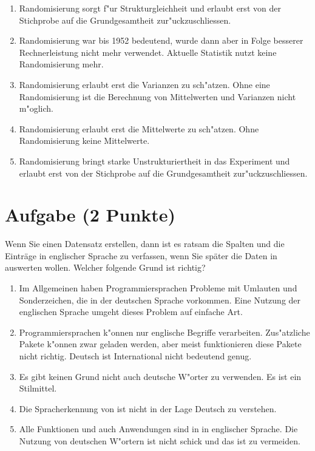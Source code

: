 \documentclass[a4paper, 10pt]{scrartcl}\usepackage[]{graphicx}\usepackage[]{xcolor}
\begin{document}
\begin{enumerate}
\item [\textbf{A} \msquare] Randomisierung sorgt f{"u}r Strukturgleichheit und erlaubt erst von der Stichprobe auf die Grundgesamtheit zur{"u}ckzuschliessen.
\item [\textbf{B} \msquare] Randomisierung war bis 1952 bedeutend, wurde dann aber in Folge besserer Rechnerleistung nicht mehr verwendet. Aktuelle Statistik nutzt keine Randomisierung mehr.
\item [\textbf{C} \msquare] Randomisierung erlaubt erst die Varianzen zu sch{"a}tzen. Ohne eine Randomisierung ist die Berechnung von Mittelwerten und Varianzen nicht m{"o}glich.
\item [\textbf{D} \msquare] Randomisierung erlaubt erst die Mittelwerte zu sch{"a}tzen. Ohne Randomisierung keine Mittelwerte.
\item [\textbf{E} \msquare] Randomisierung bringt starke Unstrukturiertheit in das Experiment und erlaubt erst von der Stichprobe auf die Grundgesamtheit zur{"u}ckzuschliessen.
\end{enumerate}

\section{Aufgabe \hfill (2 Punkte)}

Wenn Sie einen Datensatz erstellen, dann ist es ratsam die Spalten und die
Eintr{\"a}ge in englischer Sprache zu verfassen, wenn Sie sp{\"a}ter die Daten in
\Rlogo auswerten wollen. Welcher folgende Grund ist richtig?



\begin{enumerate}
\item [\textbf{A} \msquare] Im Allgemeinen haben Programmiersprachen Probleme mit Umlauten und Sonderzeichen, die in der deutschen Sprache vorkommen. Eine Nutzung der englischen Sprache umgeht dieses Problem auf einfache Art.
\item [\textbf{B} \msquare] Programmiersprachen k{"o}nnen nur englische Begriffe verarbeiten. Zus{"a}tzliche Pakete k{"o}nnen zwar geladen werden, aber meist funktionieren diese Pakete nicht richtig. Deutsch ist International nicht bedeutend genug.
\item [\textbf{C} \msquare] Es gibt keinen Grund nicht auch deutsche W{"o}rter zu verwenden. Es ist ein Stilmittel.
\item [\textbf{D} \msquare] Die Spracherkennung von \Rlogo ist nicht in der Lage Deutsch zu verstehen.
\item [\textbf{E} \msquare] Alle Funktionen und auch Anwendungen sind in \Rlogo in englischer Sprache. Die Nutzung von deutschen W{"o}rtern ist nicht schick und das ist zu vermeiden.
\end{enumerate}
\end{document}
